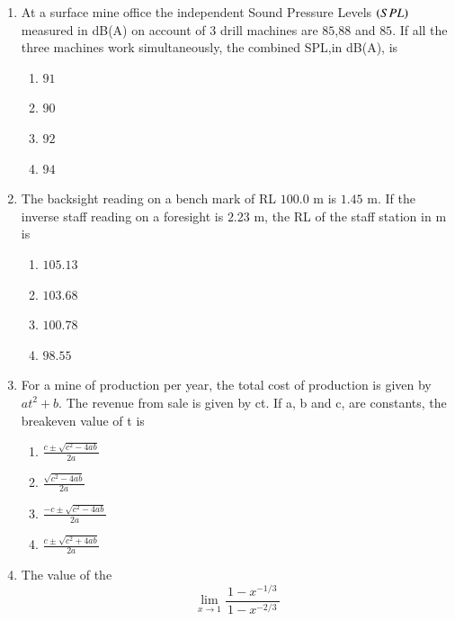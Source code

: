 \documentclass[journal,12pt,onecolumn]{IEEEtran}
\theoremstyle{remark}
\begin{document}
\begin{enumerate}
\hfill{}
\begin{multicols}{4}
\begin{enumerate}
\item triangular chocks
\item screw props 
\item safari supports
\item hydraulic props
\end{enumerate}
\end{multicols}
\item At a surface mine office the independent Sound Pressure Levels $\left(SPL\right)$ measured in dB(A) on account of $3$ drill machines are $85$,$88$ and $85$. If all the three machines work simultaneously, the combined SPL,in dB(A), is

\hfill{}
\begin{multicols}{4}
\begin{enumerate}
\item $91$
\item $90$ 
\item $92$
\item $94$
\end{enumerate}
\end{multicols}
\item The backsight reading on a bench mark of RL $100.0$ m is $1.45$ m. If the inverse staff reading on a foresight is $2.23$ m, the RL of the staff station in m is

\hfill{}
\begin{multicols}{4}
\begin{enumerate}
\item $105.13$
\item $103.68$ 
\item $100.78$
\item $98.55$
\end{enumerate}
\end{multicols}
\item For a mine of production per year, the total cost of production is given by $at^2 + b$. The revenue from sale is given by ct. If a, b and c, are constants, the breakeven value of t is

\hfill{}
  \begin{multicols}{2}
  \begin{enumerate}
    \item $\displaystyle \frac{c \pm \sqrt{c^2 - 4ab}}{2a}$
    \item $\displaystyle \frac{\sqrt{c^2 - 4ab}}{2a}$
    \item $\displaystyle \frac{-c \pm \sqrt{c^2 - 4ab}}{2a}$
    \item $\displaystyle \frac{c \pm \sqrt{c^2 + 4ab}}{2a}$
\end{enumerate}
  \end{multicols}
\item The value of the\[\lim_{x \to 1} \frac{\,1 - x^{-1/3}\,}{\,1 - x^{-2/3}\,}\]


\end{enumerate}
\end{document}
